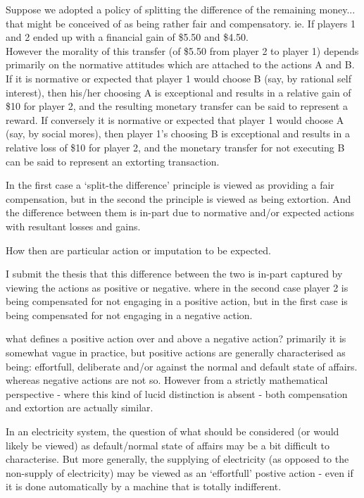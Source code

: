 Suppose we adopted a policy of splitting the difference of the remaining money... that might be conceived of as being rather fair and compensatory. ie. If players 1 and 2 ended up with a financial gain of \$5.50 and \$4.50.\\

However the morality of this transfer (of \$5.50 from player 2 to player 1) depends primarily on the normative attitudes which are attached to the actions A and B.\\

If it is normative or expected that player 1 would choose B (say, by rational self interest), then his/her choosing A is exceptional and results in a relative gain of \$10 for player 2, and the resulting monetary transfer can be said to represent a reward.
If conversely it is normative or expected that player 1 would choose A (say, by social mores), then player 1's choosing B is exceptional and results in a relative loss of \$10 for player 2, and the monetary transfer for not executing B can be said to represent an extorting transaction.

In the first case a `split-the difference' principle is viewed as providing a fair compensation, but in the second the principle is viewed as being extortion.
And the difference between them is in-part due to normative and/or expected actions with resultant losses and gains.

How then are particular action or imputation to be expected.

I submit the thesis that this difference between the two is in-part captured by viewing the actions as positive or negative. where in the second case player 2 is being compensated for not engaging in a positive action, but in the first case is being compensated for not engaging in a negative action.

what defines a positive action over and above a negative action?
primarily it is somewhat vague in practice, but positive actions are generally characterised as being: effortfull, deliberate and/or against the normal and default state of affairs. whereas negative actions are not so.
However from a strictly mathematical perspective - where this kind of lucid distinction is absent - both compensation and extortion are actually similar.

In an electricity system, the question of what should be considered (or would likely be viewed) as default/normal state of affairs may be a bit difficult to characterise.
But more generally, the supplying of electricity (as opposed to the non-supply of electricity) may be viewed as an `effortfull' postive action - even if it is done automatically by a machine that is totally indifferent.

